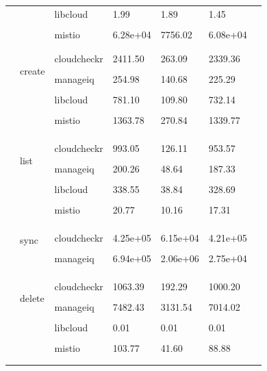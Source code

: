 \begin{table}[ht]
\begin{center}
\begin{tabular}{lllllll}
 	 & & libcloud & 1.99 & 1.89 & 1.45\\ \\[-1em] 
 	 & & mistio & 6.28e+04 & 7756.02 & 6.08e+04\\ \\[-1em] 
 	 \\[-1em] \hline
	\multirow{14}{*}{\rotatebox[origin=c]{90}{aws-provider}} & \multirow{4}{*}{create} & cloudcheckr & 2411.50 & 263.09 & 2339.36\\ \\[-1em] 
 	 & & manageiq & 254.98 & 140.68 & 225.29\\ \\[-1em] 
 	 & & libcloud & 781.10 & 109.80 & 732.14\\ \\[-1em] 
 	 & & mistio & 1363.78 & 270.84 & 1339.77\\ \\[-1em] 
 	\\[-1em] \cline{2-6} \\[-1em] & \multirow{4}{*}{list} & cloudcheckr & 993.05 & 126.11 & 953.57\\ \\[-1em] 
 	 & & manageiq & 200.26 & 48.64 & 187.33\\ \\[-1em] 
 	 & & libcloud & 338.55 & 38.84 & 328.69\\ \\[-1em] 
 	 & & mistio & 20.77 & 10.16 & 17.31\\ \\[-1em] 
 	\\[-1em] \cline{2-6} \\[-1em] & \multirow{2}{*}{sync} & cloudcheckr & 4.25e+05 & 6.15e+04 & 4.21e+05\\ \\[-1em] 
 	 & & manageiq & 6.94e+05 & 2.06e+06 & 2.75e+04\\ \\[-1em] 
 	\\[-1em] \cline{2-6} \\[-1em] & \multirow{4}{*}{delete} & cloudcheckr & 1063.39 & 192.29 & 1000.20\\ \\[-1em] 
 	 & & manageiq & 7482.43 & 3131.54 & 7014.02\\ \\[-1em] 
 	 & & libcloud & 0.01 & 0.01 & 0.01\\ \\[-1em] 
 	 & & mistio & 103.77 & 41.60 & 88.88\\ \\[-1em] 
 	\\[-1em] \hline
\end{tabular}
\end{center}
\label{tab:time}
\end{table}

